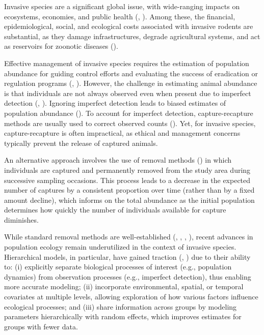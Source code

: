 \documentclass[
  11pt,
  a4paper,
]{article}
\begin{document}
Invasive species are a significant global issue, with wide-ranging impacts on ecosystems, economies, and public health (, ). Among these, the financial, epidemiological, social, and ecological costs associated with invasive rodents are substantial, as they damage infrastructures, degrade agricultural systems, and act as reservoirs for zoonotic diseases ().

Effective management of invasive species requires the estimation of population abundance for guiding control efforts and evaluating the success of eradication or regulation programs (, ). However, the challenge in estimating animal abundance is that individuals are not always observed even when present due to imperfect detection (, ). Ignoring imperfect detection leads to biased estimates of population abundance (). To account for imperfect detection, capture-recapture methods are usually used to correct observed counts (). Yet, for invasive species, capture-recapture is often impractical, as ethical and management concerns typically prevent the release of captured animals.

An alternative approach involves the use of removal methods () in which individuals are captured and permanently removed from the study area during successive sampling occasions. This process leads to a decrease in the expected number of captures by a consistent proportion over time (rather than by a fixed amount decline), which informs on the total abundance as the initial population determines how quickly the number of individuals available for capture diminishes.

While standard removal methods are well-established (, , , ), recent advances in population ecology remain underutilized in the context of invasive species. Hierarchical models, in particular, have gained traction (, ) due to their ability to: (i) explicitly separate biological processes of interest (e.g., population dynamics) from observation processes (e.g., imperfect detection), thus enabling more accurate modeling; (ii) incorporate environmental, spatial, or temporal covariates at multiple levels, allowing exploration of how various factors influence ecological processes; and (iii) share information across groups by modeling parameters hierarchically with random effects, which improves estimates for groups with fewer data.
\end{document}
